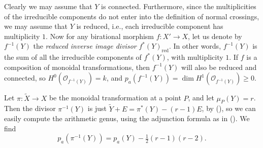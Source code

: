 {\Proof Clearly we may assume that $Y$ is connected. Furthermore, since the multiplicities of the irreducible components do not enter into the definition of normal crossings, we may assume that $Y$ is reduced, i.e., each irreducible component has multiplicity $1$. Now for any birational morphism $f\colon X'\to X$, let us denote by $f^{-1}(Y)$ the \emph{reduced inverse image divisor} $f^*(Y)_{\mathrm{red}}$. In other words, $f^{-1}(Y)$ is the sum of all the irreducible components of $f^*(Y)$, with multiplicity $1$. If $f$ is a composition of monoidal transformations, then $f^{-1}(Y)$ will also be reduced and connected, so $H^0(\mathcal O_{f^{-1}(Y)})=k$, and $p_a(f^{-1}(Y))=\dim H^1(\mathcal O_{f^{-1}(Y)})\ge0$.

Let $\pi\colon\widetilde X\to X$ be the monoidal transformation at a point $P$\EditionText{}, and let $\mu_P(Y)=r$. Then the divisor $\pi^{-1}(Y)$ is just $\widetilde Y+E=\pi^*(Y)-(r-1)E$, by (), so we can easily compute the arithmetic genus, using the adjunction formula as in (). We find
\[
p_a(\pi^{-1}(Y))=p_a(Y)-\tfrac12(r-1)(r-2).
\]
}

